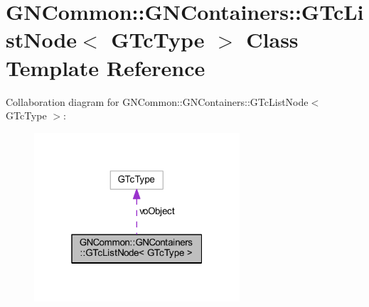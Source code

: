 \hypertarget{class_g_n_common_1_1_g_n_containers_1_1_g_tc_list_node}{}\section{G\+N\+Common\+:\+:G\+N\+Containers\+:\+:G\+Tc\+List\+Node$<$ G\+Tc\+Type $>$ Class Template Reference}
\label{class_g_n_common_1_1_g_n_containers_1_1_g_tc_list_node}


Collaboration diagram for G\+N\+Common\+:\+:G\+N\+Containers\+:\+:G\+Tc\+List\+Node$<$ G\+Tc\+Type $>$\+:\nopagebreak
\begin{figure}[H]
\begin{center}
\leavevmode
\includegraphics[width=217pt]{class_g_n_common_1_1_g_n_containers_1_1_g_tc_list_node__coll__graph}
\end{center}
\end{figure}
